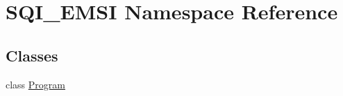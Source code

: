 \hypertarget{namespace_s_q_i___e_m_s_i}{}\section{S\+Q\+I\+\_\+\+E\+M\+S\+I Namespace Reference}
\label{namespace_s_q_i___e_m_s_i}
\subsection*{Classes}
\begin{DoxyCompactItemize}
\item 
class \hyperlink{class_s_q_i___e_m_s_i_1_1_program}{Program}
\end{DoxyCompactItemize}
